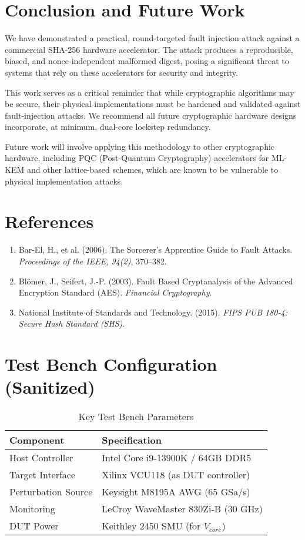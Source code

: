 \documentclass[11pt, a4paper]{article}
\begin{document}
\section{Conclusion and Future Work}
We have demonstrated a practical, round-targeted fault injection attack against a commercial SHA-256 hardware accelerator. The attack produces a reproducible, biased, and nonce-independent malformed digest, posing a significant threat to systems that rely on these accelerators for security and integrity.

This work serves as a critical reminder that while cryptographic algorithms may be secure, their physical implementations must be hardened and validated against fault-injection attacks. We recommend all future cryptographic hardware designs incorporate, at minimum, dual-core lockstep redundancy.

Future work will involve applying this methodology to other cryptographic hardware, including PQC (Post-Quantum Cryptography) accelerators for ML-KEM and other lattice-based schemes, which are known to be vulnerable to physical implementation attacks.

\section*{References}
\begin{enumerate}
    \item Bar-El, H., et al. (2006). The Sorcerer's Apprentice Guide to Fault Attacks. \textit{Proceedings of the IEEE, 94(2)}, 370--382.\label{bar-el2006fault}
    \item Bl\"omer, J., Seifert, J.-P. (2003). Fault Based Cryptanalysis of the Advanced Encryption Standard (AES). \textit{Financial Cryptography}.\label{blomer2003fault}
    \item National Institute of Standards and Technology. (2015). \textit{FIPS PUB 180-4: Secure Hash Standard (SHS)}.
\end{enumerate}

\appendix
\section{Test Bench Configuration (Sanitized)}\label{sec:testbench}
\begin{table}[h]
\centering
\caption{Key Test Bench Parameters}
\label{tab:testbench}
\begin{tabular}{@{}ll@{}}
\toprule
\textbf{Component} & \textbf{Specification} \\ \midrule
Host Controller & Intel Core i9-13900K / 64GB DDR5 \\
Target Interface & Xilinx VCU118 (as DUT controller) \\
Perturbation Source & Keysight M8195A AWG (65 GSa/s) \\
Monitoring & LeCroy WaveMaster 830Zi-B (30 GHz) \\
DUT Power & Keithley 2450 SMU (for $V_{core}$) \\ \bottomrule
\end{tabular}
\end{table}
\end{document}
